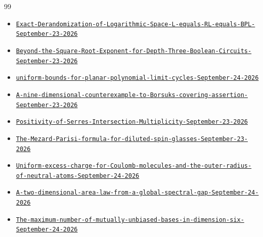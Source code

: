 \documentclass[11pt]{article}
\begin{document}
\begin{thebibliography}{99}
\begin{itemize}[nosep,leftmargin=2.2em,labelsep=0.5em]
\item[103] {\small \href{https://github.com/openai/math/tree/fd4aeeb2ee4fc729c18d98444fed42fd0529eeeb/preprints/Exact-Derandomization-of-Logarithmic-Space-L-equals-RL-equals-BPL-September-23-2026}{\nolinkurl{Exact-Derandomization-of-Logarithmic-Space-L-equals-RL-equals-BPL-September-23-2026}}}
\item[112] {\small \href{https://github.com/openai/math/tree/fd4aeeb2ee4fc729c18d98444fed42fd0529eeeb/preprints/Beyond-the-Square-Root-Exponent-for-Depth-Three-Boolean-Circuits-September-23-2026}{\nolinkurl{Beyond-the-Square-Root-Exponent-for-Depth-Three-Boolean-Circuits-September-23-2026}}}
\item[143] {\small \href{https://github.com/openai/math/tree/fd4aeeb2ee4fc729c18d98444fed42fd0529eeeb/preprints/uniform-bounds-for-planar-polynomial-limit-cycles-September-24-2026}{\nolinkurl{uniform-bounds-for-planar-polynomial-limit-cycles-September-24-2026}}}
\item[156] {\small \href{https://github.com/openai/math/tree/fd4aeeb2ee4fc729c18d98444fed42fd0529eeeb/preprints/A-nine-dimensional-counterexample-to-Borsuks-covering-assertion-September-23-2026}{\nolinkurl{A-nine-dimensional-counterexample-to-Borsuks-covering-assertion-September-23-2026}}}
\item[193] {\small \href{https://github.com/openai/math/tree/fd4aeeb2ee4fc729c18d98444fed42fd0529eeeb/preprints/Positivity-of-Serres-Intersection-Multiplicity-September-23-2026}{\nolinkurl{Positivity-of-Serres-Intersection-Multiplicity-September-23-2026}}}
\item[221] {\small \href{https://github.com/openai/math/tree/fd4aeeb2ee4fc729c18d98444fed42fd0529eeeb/preprints/The-Mezard-Parisi-formula-for-diluted-spin-glasses-September-23-2026}{\nolinkurl{The-Mezard-Parisi-formula-for-diluted-spin-glasses-September-23-2026}}}
\item[263] {\small \href{https://github.com/openai/math/tree/fd4aeeb2ee4fc729c18d98444fed42fd0529eeeb/preprints/Uniform-excess-charge-for-Coulomb-molecules-and-the-outer-radius-of-neutral-atoms-September-24-2026}{\nolinkurl{Uniform-excess-charge-for-Coulomb-molecules-and-the-outer-radius-of-neutral-atoms-September-24-2026}}}
\item[265] {\small \href{https://github.com/openai/math/tree/fd4aeeb2ee4fc729c18d98444fed42fd0529eeeb/preprints/A-two-dimensional-area-law-from-a-global-spectral-gap-September-24-2026}{\nolinkurl{A-two-dimensional-area-law-from-a-global-spectral-gap-September-24-2026}}}
\item[266] {\small \href{https://github.com/openai/math/tree/fd4aeeb2ee4fc729c18d98444fed42fd0529eeeb/preprints/The-maximum-number-of-mutually-unbiased-bases-in-dimension-six-September-24-2026}{\nolinkurl{The-maximum-number-of-mutually-unbiased-bases-in-dimension-six-September-24-2026}}}

\end{itemize}
\end{thebibliography}
\end{document}
